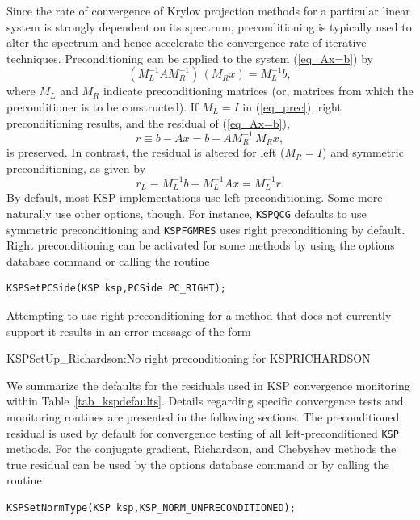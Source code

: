 Since the rate of convergence of Krylov projection methods for a
particular linear system is strongly dependent on its spectrum,
preconditioning is typically used to alter the spectrum and hence
accelerate the convergence rate of iterative techniques.
Preconditioning can be applied to the system (\ref{eq_Ax=b}) by
\begin{equation}
(M_L^{-1} A M_R^{-1}) \, (M_R x) = M_L^{-1} b,
\label{eq_prec}
\end{equation}
where $ M_L$ and $ M_R $ indicate preconditioning matrices (or, matrices
from which the preconditioner is to be constructed).  If $ M_L = I $
in (\ref{eq_prec}), right preconditioning results, and the
residual of (\ref{eq_Ax=b}),
  \[ r \equiv b - Ax = b - A M_R^{-1} \, M_R x, \]
is preserved.  In contrast, the residual is altered for left
($ M_R = I $) and symmetric preconditioning, as given by
  \[ r_L \equiv M_L^{-1} b - M_L^{-1} A x = M_L^{-1} r. \]
By default, most KSP implementations use left preconditioning.
Some more naturally use other options, though. For instance, \lstinline{KSPQCG} defaults to use symmetric preconditioning and \lstinline{KSPFGMRES} uses right preconditioning by default. 
Right preconditioning can be activated for some methods by
using the options database command  or
calling the routine 
\begin{lstlisting}
KSPSetPCSide(KSP ksp,PCSide PC_RIGHT);
\end{lstlisting}
Attempting to use right preconditioning for a method that
does not currently support it results in an error message of the form
\begin{outputlisting}
KSPSetUp_Richardson:No right preconditioning for KSPRICHARDSON
\end{outputlisting}

We summarize the defaults for the residuals used in KSP convergence
monitoring within Table~\ref{tab_kspdefaults}.  Details regarding 
specific convergence tests and monitoring routines are presented in
the following sections.  The preconditioned residual is used by
default for convergence testing of all left-preconditioned \lstinline{KSP}
methods. For the conjugate gradient, Richardson, and
Chebyshev methods the true residual can be used by
the options database command  or by calling the routine
\begin{lstlisting}
KSPSetNormType(KSP ksp,KSP_NORM_UNPRECONDITIONED);
\end{lstlisting}

